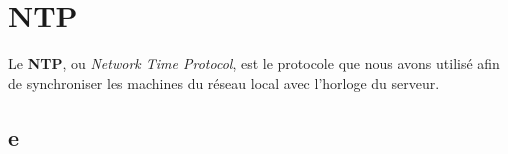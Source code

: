 \section{NTP}
\label{sec:ntp}

Le \textbf{NTP}, ou \textit{Network Time Protocol}, est le protocole que nous
avons utilisé afin de synchroniser les machines du réseau local avec l'horloge
du serveur.


\subsection{e}
\label{sec:e}
